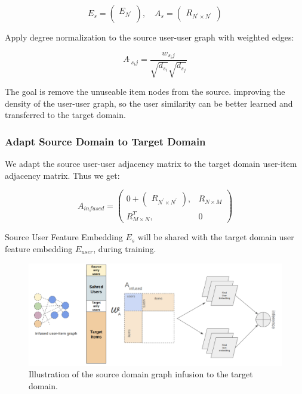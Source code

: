 \begin{equation}
    E_{s} = \begin{pmatrix}
    E_{N^{'}} \\
    \end{pmatrix},
    \quad
    A_{s} = \begin{pmatrix}
       R_{N^{'} \times N^{'}}
        \end{pmatrix}
\end{equation}

Apply degree normalization to the source user-user graph with weighted edges:

\begin{equation}
    A\tilde{~}_{s_ij} = \frac{ w_{s_ij}}{\sqrt{d_{s_i}} \sqrt{d_{s_j}}}
\end{equation}

The goal is remove the unuseable item nodes from the source. improving the density of the user-user graph, so the user similarity can be better learned and transferred to the target domain.


\subsubsection{Adapt Source Domain to Target Domain}

We adapt the source user-user adjacency matrix to the target domain user-item adjacency matrix.
Thus we get:

\begin{equation}
A_{infused} = \begin{pmatrix}
    0 + \begin{pmatrix}
        R_{N^{'} \times N^{'}}
        \end{pmatrix}, & R_{N \times M} \\
    R^T_{M \times N}, & 0

\end{pmatrix}
\end{equation}

Source User Feature Embedding $E_{s}$ will be shared with the target domain user feature embedding $E_{user}$, during training.

\begin{figure}
    \centering
    \includegraphics[width=1\textwidth]{figs/infused-domain-graph.png}
    \caption{Illustration of the source domain graph infusion to the target domain.}
    \label{fig:source-target-infusion}
\end{figure}


